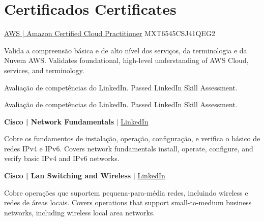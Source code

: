 \section{
    {Certificados}
    {Certificates}
  }
  \vspace{3pt}
  \resumeSubHeadingListStart

    \resumeSubheading
      {\href{https://aw.certmetrics.com/amazon/public/verification.aspx}{\color{blue}AWS | Amazon Certified Cloud Practitioner} MXT6545CSJ41QEG2}%

      {%
          {Valida a compreensão básica e de alto nível dos serviços, da terminologia e da Nuvem AWS.}
          {Validates foundational, high-level understanding of AWS Cloud, services, and terminology.}
      }{}


    \resumeSubheading
      {\href{https://www.linkedin.com/posts/rafaeldutra_avaliaaexaetodecompetaeanciasdolinkedin-amazon-activity-6828541259569733632-to9L?utm_source=share}{}}%

      {%
          {Avaliação de competências do LinkedIn.}
          {Passed LinkedIn Skill Assessment.}
      }{}

    \resumeSubheading
      {\href{https://linkedin.com/in/rafaeldutra}{}}

      {%
          {Avaliação de competências do LinkedIn.}
          {Passed LinkedIn Skill Assessment.}
      }{}

    \resumeSubheading
      {\textbf{Cisco | Network Fundamentals} $|$ \href{https://linkedin.com/in/rafaeldutra}{\color{blue}LinkedIn}}

      {%
          {Cobre os fundamentos de instalação, operação, configuração, e verifica o básico de redes IPv4 e IPv6.}
          {Covers network fundamentals install, operate, configure, and verify basic IPv4 and IPv6 networks.}
      }{}

    \resumeSubheading
      {\textbf{Cisco | Lan Switching and Wireless} $|$ \href{https://linkedin.com/in/rafaeldutra}{\color{blue}LinkedIn}}

      {%
          {Cobre operações que suportem pequena-para-média redes, incluindo wireless e redes de áreas locais.}
          {Covers operations that support small-to-medium business networks, including wireless local area networks.}
      }{}

  \resumeSubHeadingListEnd
